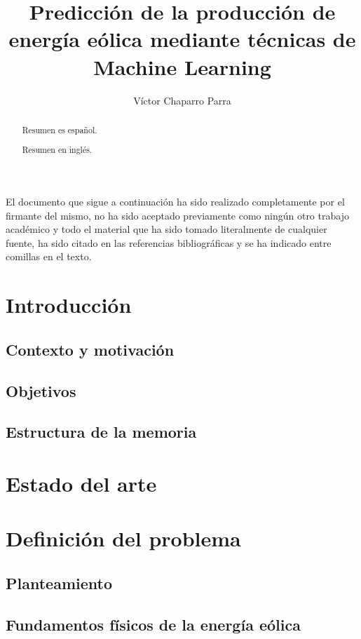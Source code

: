 \documentclass[11pt,a4paper]{article}
\author{Víctor Chaparro Parra}
\title{Predicción de la producción de energía eólica mediante técnicas de Machine Learning}
\date{}
\begin{document}
%

\begin{titlepage}
El documento que sigue a continuación ha sido realizado completamente por el firmante del mismo, no ha sido aceptado previamente como ningún otro trabajo académico y todo el material que ha sido tomado literalmente de cualquier fuente, ha sido citado en las referencias bibliográficas y se ha indicado entre comillas en el texto.

\end{titlepage}

\begin{abstract}
  Resumen es español.
\end{abstract}


\begin{abstract}
  Resumen en inglés.
\end{abstract}

\newpage
 \tableofcontents

\section{Introducción}
\subsection{Contexto y motivación}
\subsection{Objetivos}
\subsection{Estructura de la memoria}

\section{Estado del arte}
\section{Definición del problema}
\subsection{Planteamiento}
\subsection{Fundamentos físicos de la energía eólica}
\end{document}
